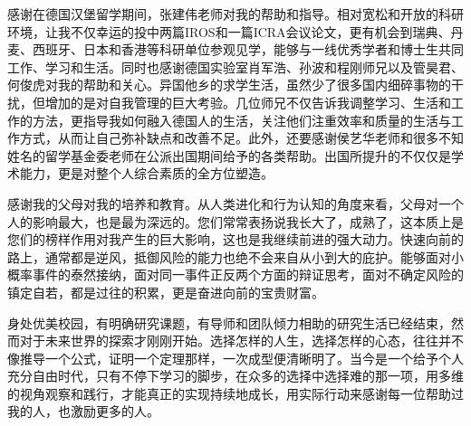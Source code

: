 \begin{ack}
感谢在德国汉堡留学期间，张建伟老师对我的帮助和指导。相对宽松和开放的科研环境，让我不仅幸运的投中两篇IROS和一篇ICRA会议论文，更有机会到瑞典、丹麦、西班牙、日本和香港等科研单位参观见学，能够与一线优秀学者和博士生共同工作、学习和生活。同时也感谢德国实验室肖军浩、孙波和程刚师兄以及管昊君、何俊虎对我的帮助和关心。异国他乡的求学生活，虽然少了很多国内细碎事物的干扰，但增加的是对自我管理的巨大考验。几位师兄不仅告诉我调整学习、生活和工作的方法，更指导我如何融入德国人的生活，关注他们注重效率和质量的生活与工作方式，从而让自己弥补缺点和改善不足。此外，还要感谢侯艺华老师和很多不知姓名的留学基金委老师在公派出国期间给予的各类帮助。出国所提升的不仅仅是学术能力，更是对整个人综合素质的全方位塑造。

感谢我的父母对我的培养和教育。从人类进化和行为认知的角度来看，父母对一个人的影响最大，也是最为深远的。您们常常表扬说我长大了，成熟了，这本质上是您们的榜样作用对我产生的巨大影响，这也是我继续前进的强大动力。快速向前的路上，通常都是逆风，抵御风险的能力也绝不会来自从小到大的庇护。能够面对小概率事件的泰然接纳，面对同一事件正反两个方面的辩证思考，面对不确定风险的镇定自若，都是过往的积累，更是奋进向前的宝贵财富。

身处优美校园，有明确研究课题，有导师和团队倾力相助的研究生活已经结束，然而对于未来世界的探索才刚刚开始。选择怎样的人生，选择怎样的心态，往往并不像推导一个公式，证明一个定理那样，一次成型便清晰明了。当今是一个给予个人充分自由时代，只有不停下学习的脚步，在众多的选择中选择难的那一项，用多维的视角观察和践行，才能真正的实现持续地成长，用实际行动来感谢每一位帮助过我的人，也激励更多的人。

\end{ack}
